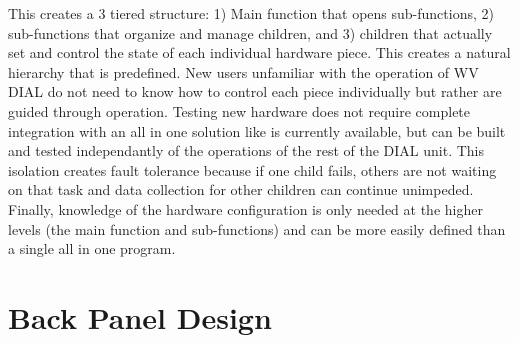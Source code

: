 This creates a 3 tiered structure: 1) Main function that opens sub-functions, 2) sub-functions that organize and manage children, and 3) children that actually set and control the state of each individual hardware piece. This creates a natural hierarchy that is predefined. New users unfamiliar with the operation of WV DIAL do not need to know how to control each piece individually but rather are guided through operation. Testing new hardware does not require complete integration with an all in one solution like is currently available, but can be built and tested independantly of the operations of the rest of the DIAL unit. This isolation creates fault tolerance because if one child fails, others are not waiting on that task and data collection for other children can continue unimpeded. Finally, knowledge of the hardware configuration is only needed at the higher levels (the main function and sub-functions) and can be more easily defined than a single all in one program. 





\section{Back Panel Design}\label{Sec:BPDesign}

